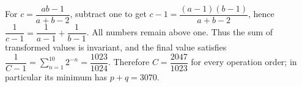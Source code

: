 For $c=\dfrac{ab-1}{a+b-2}$, subtract one to get $c-1=\dfrac{(a-1)(b-1)}{a+b-2}$, hence $\dfrac{1}{c-1}=\dfrac{1}{a-1}+\dfrac{1}{b-1}$. All numbers remain above one. Thus the sum of transformed values is invariant, and the final value satisfies $\dfrac{1}{C-1}=\sum_{n=1}^{10}2^{-n}=\dfrac{1023}{1024}$. Therefore $C=\dfrac{2047}{1023}$ for every operation order; in particular its minimum has $\boxed{p+q=3070}$.
